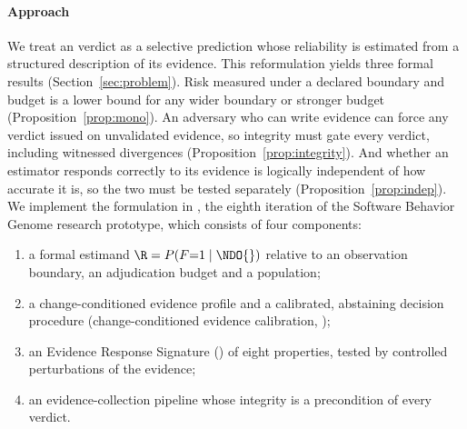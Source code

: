 \paragraph*{Approach} We treat an \NDO{} verdict as a selective prediction whose reliability is estimated from a structured description of its evidence. This reformulation yields three formal results (Section~\ref{sec:problem}). Risk measured under a declared boundary and budget is a lower bound for any wider boundary or stronger budget (Proposition~\ref{prop:mono}). An adversary who can write evidence can force any verdict issued on unvalidated evidence, so integrity must gate every verdict, including witnessed divergences (Proposition~\ref{prop:integrity}). And whether an estimator responds correctly to its evidence is logically independent of how accurate it is, so the two must be tested separately (Proposition~\ref{prop:indep}). We implement the formulation in \sbg{}, the eighth iteration of the Software Behavior Genome research prototype, which consists of four components:
\begin{enumerate}
\item a formal estimand $\R=P(F{=}1\mid\NDO{})$ relative to an observation boundary, an adjudication budget and a population;
\item a change-conditioned evidence profile and a calibrated, abstaining decision procedure (change-conditioned evidence calibration, \cec{});
\item an Evidence Response Signature (\ers{}) of eight properties, tested by controlled perturbations of the evidence;
\item an evidence-collection pipeline whose integrity is a precondition of every verdict.
\end{enumerate}

